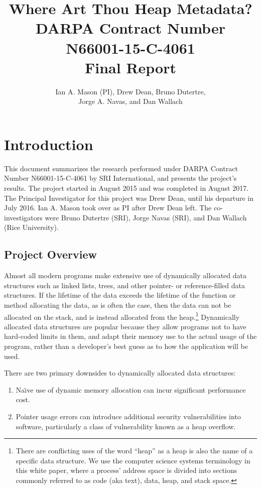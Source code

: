 \documentclass[twoside,12pt]{cslreport}
\title{{\bf Where Art Thou Heap Metadata?}\\[5mm]
\Large  DARPA Contract Number N66001-15-C-4061\\[5mm] 
Final Report}
\author{Ian A. Mason (PI), Drew Dean, Bruno Dutertre,\\
  Jorge A. Navas, and Dan Wallach}
\begin{document}
\pagestyle{plain}

\maketitle

\cleardoublepage
\tableofcontents
\listoffigures
\listoftables

\cleardoublepage


\chapter{Introduction}

This document summarizes the research performed under DARPA Contract
Number N66001-15-C-4061 by SRI International, and presents the
project's results. The project started in August 2015 and was
completed in August 2017. The Principal Investigator for this project
was Drew Dean, until his departure in July 2016. Ian A. Mason took
over as PI after Drew Dean left. The co-investigators were Bruno
Dutertre (SRI), Jorge Navas (SRI), and Dan Wallach (Rice University).


\section{Project Overview}

Almost all modern programs make extensive use of dynamically allocated
data structures  such as  linked lists, trees,  and other  pointer- or
reference-filled data structures. If the  lifetime of the data exceeds
the lifetime  of the  function or  method allocating  the data,  as is
often the case, then  the data can not be allocated  on the stack, and
is  instead allocated  from the  heap.\footnote{There are  conflicting
  uses of  the word ``heap'' as  a heap is  also the name of  a specific
  data structure. We  use the computer science  systems terminology in
  this white  paper, where  a process' address  space is  divided into
  sections commonly  referred to as  code (aka text), data,  heap, and
  stack  space.}  Dynamically  allocated data  structures are  popular
because they allow programs not to have hard-coded limits in them, and
adapt their memory use to the actual usage of the program, rather than
a  developer's best  guess as  to how  the application  will be  used.

There  are  two  primary   downsides  to  dynamically  allocated  data
structures:
\begin{enumerate}
\item Na\"{\i}ve use  of  dynamic  memory allocation  can  incur
significant  performance  cost.
\item Pointer usage errors can introduce additional security
  vulnerabilities into software, particularly a class of vulnerability
  known as a heap overflow.  
\end{enumerate}
\end{document}
